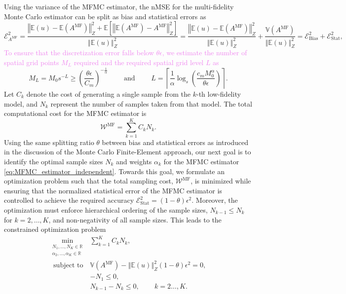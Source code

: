 \documentclass[final,3p,times,11pt]{elsarticle}
\newcommand{\JLcolor}[1]{{\textcolor{violet}{#1}}} %
\begin{document}
%
Using the variance of the MFMC estimator, the nMSE for the multi-fidelity Monte Carlo estimator can be split as bias and statistical errors as
%
\[
\mathcal{E}_{A^{\text{MF}}}^2= \frac{\left\Vert\mathbb{E}(u)-\mathbb{E}(A^{\text{MF}}) \right\Vert_{Z}^2+\mathbb E\left[\left\Vert\mathbb{E}(A^{\text{MF}})-A^{\text{MF}} \right\Vert_{Z}^2\right]}{\left\Vert\mathbb{E}(u) \right\Vert_{Z}^2} =\frac{\left\Vert\mathbb{E}(u)-\mathbb{E}(A^{\text{MF}}) \right\Vert_{Z}^2}{\left\Vert\mathbb{E}(u) \right\Vert_{Z}^2}+ \frac{\mathbb{V}\left(A^{\text{MF}}\right)}{\left\Vert\mathbb{E}(u) \right\Vert_{Z}^2}=\mathcal{E}_{\text{Bias}}^2 + \mathcal{E}_{\text{Stat}}^2,
\]
%
\JLcolor{To ensure that the discretization error falls below $\theta\epsilon$, we estimate the number of spatial grid points $M_L$ required and the required spatial grid level $L$ as }
%
\begin{equation}
    \label{eq:SLSGC_MLS_SpatialGridsNo}
    M_L = M_0s^{-L} \ge \left(\frac{\theta\epsilon}{C_m}\right)^{-\frac 1 {\alpha}} \qquad \text{ and } \qquad     L = \left\lceil \frac{1}{\alpha}\log_s \left(\frac{c_m M_0^\alpha}{\theta\epsilon}\right) \right\rceil.
\end{equation}
%
Let $C_k$ denote the cost of generating a single sample from the $k$-th low-fidelity model, and $N_k$ represent the number of samples taken from that model. The total computational cost for the MFMC estimator is 
%
\[
\mathcal{W}^{\text{MF}} = \sum_{k=1}^K C_kN_k.
\]
%
Using the same splitting ratio $\theta$ between bias and statistical errors as introduced in the discussion of the Monte Carlo Finite-Element approach, our next goal is to identify the optimal sample sizes $N_k$ and weights $\alpha_k$ for the MFMC estimator \eqref{eq:MFMC_estimator_independent}. Towards this goal, we formulate an optimization problem such that the total sampling cost,
$\mathcal{W}^{\text{MF}}$, is minimized while ensuring that the normalized statistical error of the MFMC estimator  is controlled to achieve the required accuracy  $\mathcal{E}_{\text{Stat}}^2= (1-\theta)\epsilon^2$. Moreover, the optimization must enforce hierarchical ordering of the sample sizes, $N_{k-1}\le N_k$ for $k=2,\ldots, K$, and non-negativity of all sample sizes. This leads to the constrained optimization problem
%
\begin{equation}\label{eq:Optimization_pb_sample_size}
    \begin{array}{ll}
    \min \limits_{\begin{array}{c}\scriptstyle N_1,\ldots, N_K\in \mathbb{R} \\[-4pt]
\scriptstyle \alpha_2,\ldots,\alpha_K\in \mathbb{R}
\end{array}} &\displaystyle\sum\limits_{k=1}^K C_kN_k,\\
       \;\,\text{subject to} &\mathbb{V}\left(A^{\text{MF}}\right)- \left\Vert\mathbb{E}(u) \right\Vert_{Z}^2(1-\theta)\epsilon^2 = 0,\\[2pt]
        &\displaystyle -N_1\le 0, \\[1pt]
        &\displaystyle N_{k-1}-N_k\le 0, \quad\quad\, k=2\ldots,K.\\
    \end{array}
\end{equation}
\end{document}

